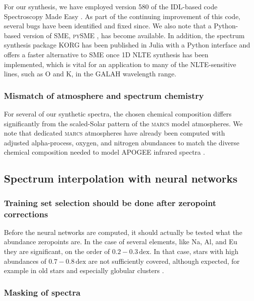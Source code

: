 \documentclass[
  journal=pasa,
  manuscript=research-paper, %
  year=2024,
  volume=37
]{cup-journal}
\newcommand{\marcs}{\textsc{marcs}\xspace}
\begin{document}
For our synthesis, we have employed version 580 of the IDL-based code Spectroscopy Made Easy \citep{Valenti1996, Piskunov2017}. As part of the continuing improvement of this code, several bugs have been identified and fixed since. We also note that a Python-based version of SME, \textsc{pySME} \citep{Wehrhahn2021}, has become available. In addition, the spectrum synthesis package \textsc{KORG} \citep{Wheeler2023, Wheeler2024} has been published in Julia with a Python interface and offers a faster alternative to SME once 1D NLTE synthesis has been implemented, which is vital for an application to many of the NLTE-sensitive lines, such as O and K, in the GALAH wavelength range.

\subsubsection{Mismatch of atmosphere and spectrum chemistry}

For several of our synthetic spectra, the chosen chemical composition differs significantly from the scaled-Solar pattern of the \marcs model atmospheres. We note that dedicated \marcs atmospheres have already been computed with adjusted alpha-process, oxygen, and nitrogen abundances to match the diverse chemical composition needed to model APOGEE infrared spectra \citep{SDSSDR17}.

\subsection{Spectrum interpolation with neural networks} \label{sec:caveats_interpolation}

\subsubsection{Training set selection should be done after zeropoint corrections}

Before the neural networks are computed, it should actually be tested what the abundance zeropoints are. In the case of several elements, like Na, Al, and Eu they are significant, on the order of $0.2-0.3\,\mathrm{dex}$. In that case, stars with high abundances of $0.7-0.8\,\mathrm{dex}$ are not sufficiently covered, although expected, for example in old stars and especially globular clusters \citep[see e.g.][]{Carretta2009}.

\subsubsection{Masking of spectra}
\end{document}
